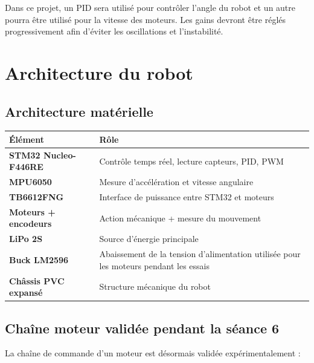 \documentclass[11pt,a4paper]{article}
\begin{document}
	Dans ce projet, un PID sera utilisé pour contrôler l'angle du robot et un autre pourra être utilisé pour la vitesse des moteurs. Les gains devront être réglés progressivement afin d'éviter les oscillations et l'instabilité.
	
	\section{Architecture du robot}
	
	\subsection*{Architecture matérielle}
	
	\begin{center}
		\begin{tabular}{>{\bfseries}p{4cm}p{9cm}}
			\toprule
			Élément & Rôle \\
			\midrule
			STM32 Nucleo-F446RE & Contrôle temps réel, lecture capteurs, PID, PWM \\
			MPU6050 & Mesure d'accélération et vitesse angulaire \\
			TB6612FNG & Interface de puissance entre STM32 et moteurs \\
			Moteurs + encodeurs & Action mécanique + mesure du mouvement \\
			LiPo 2S & Source d'énergie principale \\
			Buck LM2596 & Abaissement de la tension d'alimentation utilisée pour les moteurs pendant les essais \\
			Châssis PVC expansé & Structure mécanique du robot \\
			\bottomrule
		\end{tabular}
	\end{center}
	
	\subsection*{Chaîne moteur validée pendant la séance 6}
	
	La chaîne de commande d'un moteur est désormais validée expérimentalement :
	
	\begin{center}
	\end{center}
	
\end{document}
